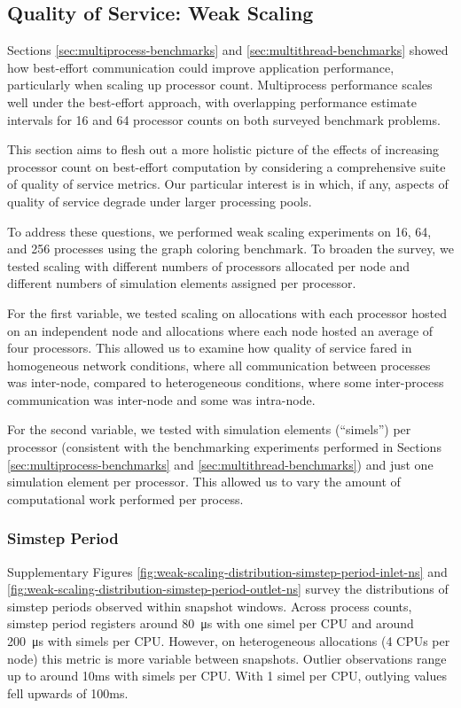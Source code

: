 \subsection{Quality of Service: Weak Scaling}
\label{sec:weak-scaling}

Sections \ref{sec:multiprocess-benchmarks} and \ref{sec:multithread-benchmarks} showed how best-effort communication could improve application performance, particularly when scaling up processor count.
Multiprocess performance scales well under the best-effort approach, with overlapping performance estimate intervals for 16 and 64 processor counts on both surveyed benchmark problems.

This section aims to flesh out a more holistic picture of the effects of increasing processor count on best-effort computation by considering a comprehensive suite of quality of service metrics.
Our particular interest is in which, if any, aspects of quality of service degrade under larger processing pools.

To address these questions, we performed weak scaling experiments on 16, 64, and 256 processes using the graph coloring benchmark.
To broaden the survey, we tested scaling with different numbers of processors allocated per node and different numbers of simulation elements assigned per processor.

For the first variable, we tested scaling on allocations with each processor hosted on an independent node and allocations where each node hosted an average of four processors.
This allowed us to examine how quality of service fared in homogeneous network conditions, where all communication between processes was inter-node, compared to heterogeneous conditions, where some inter-process communication was inter-node and some was intra-node.

For the second variable, we tested with  simulation elements (``simels'') per processor (consistent with the benchmarking experiments performed in Sections \ref{sec:multiprocess-benchmarks} and \ref{sec:multithread-benchmarks}) and just one simulation element per processor.
This allowed us to vary the amount of computational work performed per process.

\subsubsection{Simstep Period}

Supplementary Figures \ref{fig:weak-scaling-distribution-simstep-period-inlet-ns} and \ref{fig:weak-scaling-distribution-simstep-period-outlet-ns} survey the distributions of simstep periods observed within snapshot windows.
Across process counts, simstep period registers around \SI{80}{\micro\second} with one simel per CPU and around \SI{200}{\micro\second} with  simels per CPU.
However, on heterogeneous allocations (4 CPUs per node) this metric is more variable between snapshots.
Outlier observations range up to around 10ms with  simels per CPU.
With 1 simel per CPU, outlying values fell upwards of 100ms.

